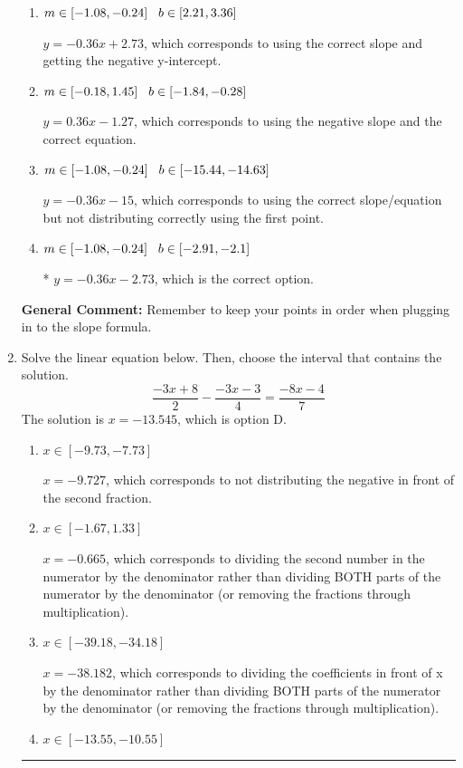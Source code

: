 \documentclass{extbook}[14pt]
\newcommand{\litem}[1]{\item #1

\rule{\textwidth}{0.4pt}}
\begin{document}
\begin{enumerate}
{\begin{enumerate}[label=\Alph*.]
 $y = -0.36x$, which corresponds to using the correct slope/equation but not distributing correctly using the second point.
\item \( m \in [-1.08, -0.24] \hspace*{3mm} b \in [2.21, 3.36] \)

 $y = -0.36x + 2.73$, which corresponds to using the correct slope and getting the negative y-intercept.
\item \( m \in [-0.18, 1.45] \hspace*{3mm} b \in [-1.84, -0.28] \)

 $y = 0.36x -1.27$, which corresponds to using the negative slope and the correct equation.
\item \( m \in [-1.08, -0.24] \hspace*{3mm} b \in [-15.44, -14.63] \)

 $y = -0.36x -15$, which corresponds to using the correct slope/equation but not distributing correctly using the first point.
\item \( m \in [-1.08, -0.24] \hspace*{3mm} b \in [-2.91, -2.1] \)

* $y = -0.36x -2.73$, which is the correct option.
\end{enumerate}

\textbf{General Comment:} Remember to keep your points in order when plugging in to the slope formula.
}
\litem{
Solve the linear equation below. Then, choose the interval that contains the solution.
\[ \frac{-3x + 8}{2} - \frac{-3x -3}{4} = \frac{-8x -4}{7} \]The solution is \( x = -13.545 \), which is option D.\begin{enumerate}[label=\Alph*.]
\item \( x \in [-9.73, -7.73] \)

 $x = -9.727$, which corresponds to not distributing the negative in front of the second fraction.
\item \( x \in [-1.67, 1.33] \)

 $x = -0.665$, which corresponds to dividing the second number in the numerator by the denominator rather than dividing BOTH parts of the numerator by the denominator (or removing the fractions through multiplication).
\item \( x \in [-39.18, -34.18] \)

 $x = -38.182$, which corresponds to dividing the coefficients in front of x by the denominator rather than dividing BOTH parts of the numerator by the denominator (or removing the fractions through multiplication).
\item \( x \in [-13.55, -10.55] \)


\end{enumerate}}
\end{enumerate}
\end{document}
